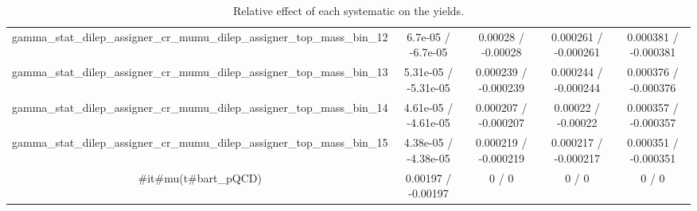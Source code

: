\documentclass[10pt]{article}
\begin{document}
\begin{table}[htbp]
\begin{center}
\begin{tabular}{|c|c|c|c|c|}
  gamma_stat_dilep_assigner_cr_mumu_dilep_assigner_top_mass_bin_12 & 6.7e-05 / -6.7e-05 & 0.00028 / -0.00028 & 0.000261 / -0.000261 & 0.000381 / -0.000381 \\ 
  gamma_stat_dilep_assigner_cr_mumu_dilep_assigner_top_mass_bin_13 & 5.31e-05 / -5.31e-05 & 0.000239 / -0.000239 & 0.000244 / -0.000244 & 0.000376 / -0.000376 \\ 
  gamma_stat_dilep_assigner_cr_mumu_dilep_assigner_top_mass_bin_14 & 4.61e-05 / -4.61e-05 & 0.000207 / -0.000207 & 0.00022 / -0.00022 & 0.000357 / -0.000357 \\ 
  gamma_stat_dilep_assigner_cr_mumu_dilep_assigner_top_mass_bin_15 & 4.38e-05 / -4.38e-05 & 0.000219 / -0.000219 & 0.000217 / -0.000217 & 0.000351 / -0.000351 \\ 
  #it{#mu}(t#bar{t}_{pQCD}) & 0.00197 / -0.00197 & 0 / 0 & 0 / 0 & 0 / 0 \\ 
\hline 
\end{tabular} 
\caption{Relative effect of each systematic on the yields.} 
\end{center} 
\end{table} 
\end{document}

